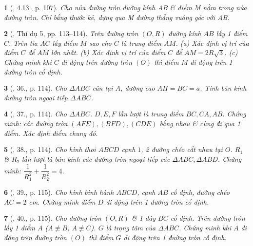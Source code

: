 \documentclass{article}
\newtheorem{baitoan}{}
\begin{document}
\begin{baitoan}[\cite{Binh_boi_duong_Toan_9_tap_1}, 4.13., p. 107]
	Cho nửa đường tròn đường kính AB \& điểm M nằm trong nửa đường tròn. Chỉ bằng thước kẻ, dựng qua M đường thẳng vuông góc với AB.
\end{baitoan}

\begin{baitoan}[\cite{Tuyen_Toan_9_old}, Thí dụ 5, pp. 113--114]
	Trên đường tròn $(O,R)$ đường kính $AB$ lấy 1 điểm $C$. Trên tia $AC$ lấy điểm $M$ sao cho $C$ là trung điểm $AM$. (a) Xác định vị trí của điểm $C$ để $AM$ lớn nhất. (b) Xác định vị trí của điểm $C$ để $AM = 2R\sqrt{3}$. (c) Chứng minh khi $C$ di động trên đường tròn $(O)$ thì điểm $M$ di động trên 1 đường tròn cố định.
\end{baitoan}

\begin{baitoan}[\cite{Tuyen_Toan_9_old}, 36., p. 114]
	Cho $\Delta ABC$ cân tại $A$, đường cao $AH = BC = a$. Tính bán kính đường tròn ngoại tiếp $\Delta ABC$.
\end{baitoan}

\begin{baitoan}[\cite{Tuyen_Toan_9_old}, 37., p. 114]
	Cho $\Delta ABC$. $D,E,F$ lần lượt là trung điểm $BC,CA,AB$. Chứng minh: các đường tròn $(AFE),(BFD),(CDE)$ bằng nhau \& cùng đi qua 1 điểm. Xác định điểm chung đó.
\end{baitoan}

\begin{baitoan}[\cite{Tuyen_Toan_9_old}, 38., p. 114]
	Cho hình thoi $ABCD$ cạnh $1$, 2 đường chéo cắt nhau tại $O$. $R_1$ \& $R_2$ lần lượt là bán kính các đường tròn ngoại tiếp các $\Delta ABC,\Delta ABD$. Chứng minh: $\dfrac{1}{R_1^2} + \dfrac{1}{R_2^2} = 4$.
\end{baitoan}

\begin{baitoan}[\cite{Tuyen_Toan_9_old}, 39., p. 115]
	Cho hình bình hành $ABCD$, cạnh $AB$ cố định, đường chéo $AC = 2$ \emph{cm}. Chứng minh điểm $D$ di động trên 1 đường tròn cố định.
\end{baitoan}

\begin{baitoan}[\cite{Tuyen_Toan_9_old}, 40., p. 115]
	Cho đường tròn $(O,R)$ \& 1 dây $BC$ cố định. Trên đường tròn lấy 1 điểm $A$ ($A\not\equiv B$, $A\not\equiv C$). $G$ là trọng tâm của $\Delta ABC$. Chứng minh khi $A$ di động trên đường tròn $(O)$ thì điểm $G$ di động trên 1 đường tròn cố định.
\end{baitoan}
\end{document}
